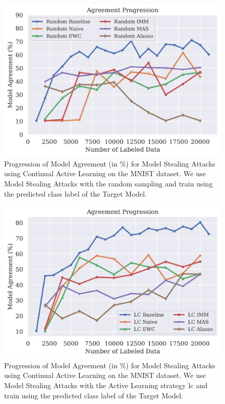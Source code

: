 \begin{figure}[h]
    \centering
    \includegraphics[width=0.7\linewidth]{images/results_CALMS/mnist_label_random.png}
    \caption[Agreement Comparison for Model Stealing on MNIST using the predicted class label and the Active Learning strategy Random]{Progression of Model Agreement
    (in \%) for Model Stealing Attacks using Continual Active Learning on the MNIST dataset. We use Model Stealing Attacks with the random sampling
    and train using the predicted class label of the Target Model.}
    \label{fig:CALMSMNISTLabelRandom}
\end{figure}

\begin{figure}[h]
    \centering
    \includegraphics[width=0.7\linewidth]{images/results_CALMS/mnist_label_lc.png}
    \caption[Agreement Comparison for Model Stealing on MNIST using the predicted class label and the Active Learning strategy LC]{Progression of Model Agreement
    (in \%) for Model Stealing Attacks using Continual Active Learning on the MNIST dataset. We use Model Stealing Attacks with the Active Learning strategy
    \gls{lc} and train using the predicted class label of the Target Model.}
    \label{fig:CALMSMNISTLabelLC}
\end{figure}

